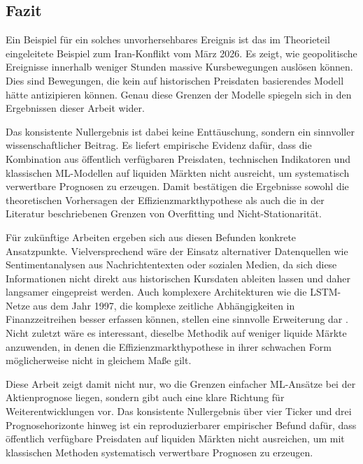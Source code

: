 \documentclass[12pt]{article}
\begin{document}
\subsection*{Fazit}

Ein Beispiel für ein solches unvorhersehbares Ereignis ist das im Theorieteil eingeleitete Beispiel zum Iran-Konflikt vom März 2026. Es zeigt, wie geopolitische Ereignisse innerhalb weniger Stunden massive Kursbewegungen auslösen können. Dies sind Bewegungen, die kein auf historischen Preisdaten basierendes Modell hätte antizipieren können. \cite{Reuters} Genau diese Grenzen der Modelle spiegeln sich in den Ergebnissen dieser Arbeit wider.

Das konsistente Nullergebnis ist dabei keine Enttäuschung, sondern ein sinnvoller wissenschaftlicher Beitrag. Es liefert empirische Evidenz dafür, dass die Kombination aus öffentlich verfügbaren Preisdaten, technischen Indikatoren und klassischen ML-Modellen auf liquiden Märkten nicht ausreicht, um systematisch verwertbare Prognosen zu erzeugen. Damit bestätigen die Ergebnisse sowohl die theoretischen Vorhersagen der Effizienzmarkthypothese als auch die in der Literatur beschriebenen Grenzen von Overfitting und Nicht-Stationarität.

Für zukünftige Arbeiten ergeben sich aus diesen Befunden konkrete Ansatzpunkte. Vielversprechend wäre der Einsatz alternativer Datenquellen wie Sentimentanalysen aus Nachrichtentexten oder sozialen Medien, da sich diese Informationen nicht direkt aus historischen Kursdaten ableiten lassen und daher langsamer eingepreist werden. Auch komplexere Architekturen wie die LSTM-Netze aus dem Jahr 1997, die komplexe zeitliche Abhängigkeiten in Finanzzeitreihen besser erfassen können, stellen eine sinnvolle Erweiterung dar \cite{hochreiter_long_1997}. Nicht zuletzt wäre es interessant, dieselbe Methodik auf weniger liquide Märkte anzuwenden, in denen die Effizienzmarkthypothese in ihrer schwachen Form möglicherweise nicht in gleichem Maße gilt.

Diese Arbeit zeigt damit nicht nur, wo die Grenzen einfacher ML-Ansätze bei der Aktienprognose liegen, sondern gibt auch eine klare Richtung für Weiterentwicklungen vor. Das konsistente Nullergebnis über vier Ticker und drei Prognosehorizonte hinweg ist ein reproduzierbarer empirischer Befund dafür, dass öffentlich verfügbare Preisdaten auf liquiden Märkten nicht ausreichen, um mit klassischen Methoden systematisch verwertbare Prognosen zu erzeugen.
\end{document}

